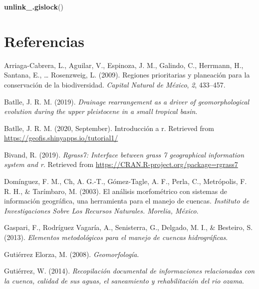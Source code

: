 \documentclass[11pt,]{article}
\newenvironment{Shaded}{\begin{snugshade}}{\end{snugshade}}
\newcommand{\KeywordTok}[1]{\textcolor[rgb]{0.13,0.29,0.53}{\textbf{#1}}}
\newcommand{\NormalTok}[1]{#1}
\begin{document}
\begin{Shaded}
\begin{Highlighting}[]
\KeywordTok{unlink_.gislock}\NormalTok{()}
\end{Highlighting}
\end{Shaded}

\section*{Referencias}\label{referencias}

\hypertarget{refs}{}
\hypertarget{ref-arriaga2009regiones}{}
Arriaga-Cabrera, L., Aguilar, V., Espinoza, J. M., Galindo, C.,
Herrmann, H., Santana, E., \ldots{} Rosenzweig, L. (2009). Regiones
prioritarias y planeación para la conservación de la biodiversidad.
\emph{Capital Natural de México}, \emph{2}, 433--457.

\hypertarget{ref-batlle2019drainage}{}
Batlle, J. R. M. (2019). \emph{Drainage rearrangement as a driver of
geomorphological evolution during the upper pleistocene in a small
tropical basin}.

\hypertarget{ref-joseramonmartinezbatlle2020}{}
Batlle, J. R. M. (2020, September). Introducción a r. Retrieved from
\url{https://geofis.shinyapps.io/tutorial1/}

\hypertarget{ref-bivand2019rgrass7}{}
Bivand, R. (2019). \emph{Rgrass7: Interface between grass 7 geographical
information system and r}. Retrieved from
\url{https://CRAN.R-project.org/package=rgrass7}

\hypertarget{ref-dominguez2003analisis}{}
Domínguez, F. M., Ch, A. G.-T., Gómez-Tagle, A. F., Perla, C.,
Metrópolis, F. R. H., \& Tarímbaro, M. (2003). El análisis morfométrico
con sistemas de información geográfica, una herramienta para el manejo
de cuencas. \emph{Instituto de Investigaciones Sobre Los Recursos
Naturales. Morelia, México}.

\hypertarget{ref-gaspari2013elementos}{}
Gaspari, F., Rodríguez Vagaría, A., Senisterra, G., Delgado, M. I., \&
Besteiro, S. (2013). \emph{Elementos metodológicos para el manejo de
cuencas hidrográficas}.

\hypertarget{ref-gutierrez2008geomorfologia}{}
Gutiérrez Elorza, M. (2008). \emph{Geomorfología}.

\hypertarget{ref-williamgutierrez2014}{}
Gutiérrez, W. (2014). \emph{Recopilación documental de informaciones
relacionadas con la cuenca, calidad de sus aguas, el saneamiento y
rehabilitación del rio ozama}.
\end{document}
